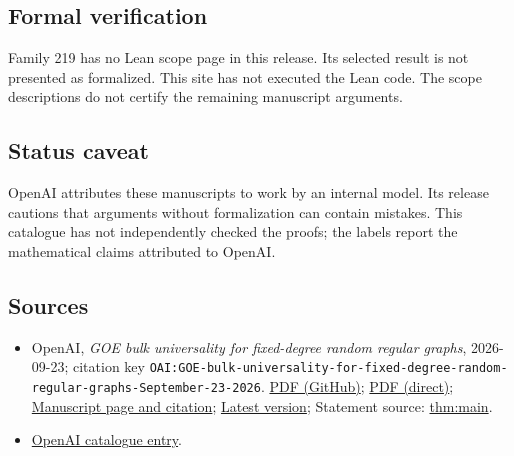 \documentclass[11pt]{article}
\begin{document}
\subsection{Formal verification}
Family 219 has no Lean scope page in this release. Its selected result is not presented as formalized. This site has not executed the Lean code. The scope descriptions do not certify the remaining manuscript arguments.

\subsection{Status caveat}
OpenAI attributes these manuscripts to work by an internal model. Its release cautions that arguments without formalization can contain mistakes. This catalogue has not independently checked the proofs; the labels report the mathematical claims attributed to OpenAI.

\subsection{Sources}
\begin{itemize}
\item OpenAI, \emph{GOE bulk universality for fixed-degree random regular graphs}, 2026-09-23; citation key \texttt{OAI:GOE-bulk-universality-for-fixed-degree-random-regular-graphs-September-23-2026}. \href{https://github.com/openai/math/blob/adc7f1241b42e322a6451854ab7e4b4c146bf78a/preprints/GOE-bulk-universality-for-fixed-degree-random-regular-graphs-September-23-2026/paper.pdf}{PDF (GitHub)}; \href{https://github.com/openai/math/raw/adc7f1241b42e322a6451854ab7e4b4c146bf78a/preprints/GOE-bulk-universality-for-fixed-degree-random-regular-graphs-September-23-2026/paper.pdf}{PDF (direct)}; \href{https://github.com/openai/math/blob/adc7f1241b42e322a6451854ab7e4b4c146bf78a/preprints/GOE-bulk-universality-for-fixed-degree-random-regular-graphs-September-23-2026/README.md}{Manuscript page and citation}; \href{https://github.com/openai/math/blob/main/preprints/GOE-bulk-universality-for-fixed-degree-random-regular-graphs-September-23-2026/paper.pdf}{Latest version}; Statement source: \href{https://github.com/openai/math/blob/adc7f1241b42e322a6451854ab7e4b4c146bf78a/preprints/GOE-bulk-universality-for-fixed-degree-random-regular-graphs-September-23-2026/build/sections/01-introduction.tex\#L41}{thm:main}.
\item \href{https://github.com/openai/math/blob/adc7f1241b42e322a6451854ab7e4b4c146bf78a/CONTENTS.md}{OpenAI catalogue entry}.
\end{itemize}
\end{document}

